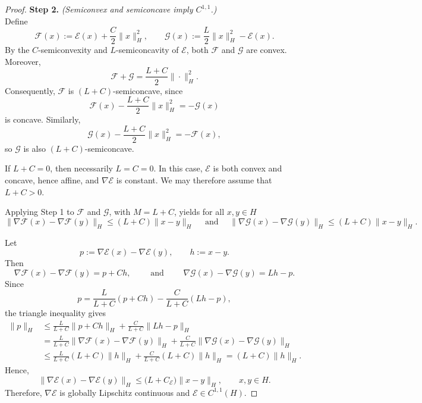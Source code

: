 \documentclass[10pt,a4paper]{amsart}
\begin{document}
\begin{proof}
\textbf{Step 2.} \textit{(Semiconvex and semiconcave imply $C^{1,1}$.)}\\
Define
\[
\mathscr{F}(x) := \mathscr{E}(x)+\frac{C}{2}\|x\|_H^2, \qquad \mathscr{G}(x) := \frac{L}{2}\|x\|_H^2-\mathscr{E}(x).
\]
By the $C$-semiconvexity and $L$-semiconcavity of $\mathscr{E}$, both $\mathscr{F}$ and $\mathscr{G}$ are convex. Moreover,
\[
\mathscr{F}+\mathscr{G} = \frac{L+C}{2}\|\cdot\|_H^2.
\]
Consequently, $\mathscr{F}$ is $(L+C)$-semiconcave, since
\[
\mathscr{F}(x)-\frac{L+C}{2}\|x\|_H^2 = -\mathscr{G}(x)
\]
is concave. Similarly,
\[
\mathscr{G}(x)-\frac{L+C}{2}\|x\|_H^2 = -\mathscr{F}(x),
\]
so $\mathscr{G}$ is also $(L+C)$-semiconcave.

If $L+C=0$, then necessarily $L=C=0$. In this case, $\mathscr{E}$ is both convex and concave, hence affine, and $\nabla\mathscr{E}$ is constant. We may therefore assume that $L+C>0$.

Applying Step 1 to $\mathscr{F}$ and $\mathscr{G}$, with $M=L+C$, yields for all $x,y\in H$
\[
\|\nabla\mathscr{F}(x)-\nabla\mathscr{F}(y)\|_H \le (L+C)\|x-y\|_H
\quad \text{ and } \quad 
\|\nabla\mathscr{G}(x)-\nabla\mathscr{G}(y)\|_H \le (L+C)\|x-y\|_H.
\]

Let
\[
p:=\nabla\mathscr{E}(x)-\nabla\mathscr{E}(y), \qquad h:=x-y.
\]
Then
\[
\nabla\mathscr{F}(x)-\nabla\mathscr{F}(y) = p+Ch, \qquad \text{ and } \qquad  \nabla\mathscr{G}(x)-\nabla\mathscr{G}(y) = Lh-p.
\]
Since
\[
p = \frac{L}{L+C}(p+Ch) - \frac{C}{L+C}(Lh-p),
\]
the triangle inequality gives
\[
\begin{aligned}
    \|p\|_H
    & \le \frac{L}{L+C}\|p+Ch\|_H + \frac{C}{L+C}\|Lh-p\|_H \\
    & = \frac{L}{L+C}\|\nabla\mathscr{F}(x)-\nabla\mathscr{F}(y)\|_H + \frac{C}{L+C}\|\nabla\mathscr{G}(x)-\nabla\mathscr{G}(y)\|_H \\
    & \le \frac{L}{L+C}(L+C)\|h\|_H + \frac{C}{L+C}(L+C)\|h\|_H 
     = (L+C)\|h\|_H.
\end{aligned}
\]
Hence,
\[
\|\nabla\mathscr{E}(x)-\nabla\mathscr{E}(y)\|_H \le \bigl(L+C_{\mathscr{E}}\bigr)\|x-y\|_H, \qquad x,y\in H.
\]
Therefore, $\nabla\mathscr{E}$ is globally Lipschitz continuous and $\mathscr{E}\in C^{1,1}(H)$. 
\end{proof}
\end{document}
